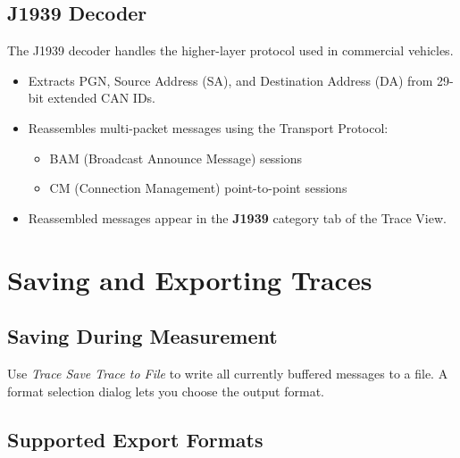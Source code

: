 \documentclass[a4paper,11pt]{article}
\newcommand{\menu}[1]{\textit{#1}}
\newcommand{\ui}[1]{\textbf{#1}}
\begin{document}
\subsection{J1939 Decoder}

The J1939 decoder handles the higher-layer protocol used in commercial vehicles.

\begin{itemize}
  \item Extracts PGN, Source Address (SA), and Destination Address (DA) from
        29-bit extended CAN IDs.
  \item Reassembles multi-packet messages using the Transport Protocol:
    \begin{itemize}
      \item BAM (Broadcast Announce Message) sessions
      \item CM (Connection Management) point-to-point sessions
    \end{itemize}
  \item Reassembled messages appear in the \ui{J1939} category tab of the Trace View.
\end{itemize}

\section{Saving and Exporting Traces}

\subsection{Saving During Measurement}

Use \menu{Trace \textrightarrow{} Save Trace to File} to write all currently buffered
messages to a file. A format selection dialog lets you choose the output format.

\subsection{Supported Export Formats}
\end{document}
